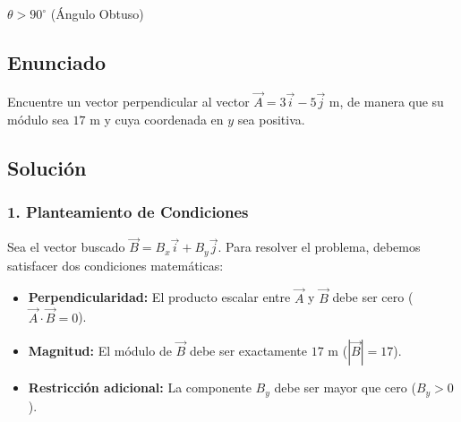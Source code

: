 \documentclass[12pt, a4paper]{article}
\begin{document}
\begin{tcolorbox}[colback=green!5!white, colframe=green!50!black, title=Respuesta Final]
\centering \Large $\theta > 90^\circ$ (Ángulo Obtuso)
\end{tcolorbox}

\newpage

\subsection*{Enunciado}
Encuentre un vector perpendicular al vector $\vec{A} = 3\vec{i} - 5\vec{j}$ m, de manera que su módulo sea $17$ m y cuya coordenada en $y$ sea positiva.

\begin{center}
\end{center}

\subsection*{Solución}

\subsubsection*{1. Planteamiento de Condiciones}
Sea el vector buscado $\vec{B} = B_x\vec{i} + B_y\vec{j}$. Para resolver el problema, debemos satisfacer dos condiciones matemáticas:

\begin{itemize}
    \item \textbf{Perpendicularidad:} El producto escalar entre $\vec{A}$ y $\vec{B}$ debe ser cero ($\vec{A} \cdot \vec{B} = 0$).
    \item \textbf{Magnitud:} El módulo de $\vec{B}$ debe ser exactamente $17$ m ($|\vec{B}| = 17$).
    \item \textbf{Restricción adicional:} La componente $B_y$ debe ser mayor que cero ($B_y > 0$).
\end{itemize}
\end{document}
